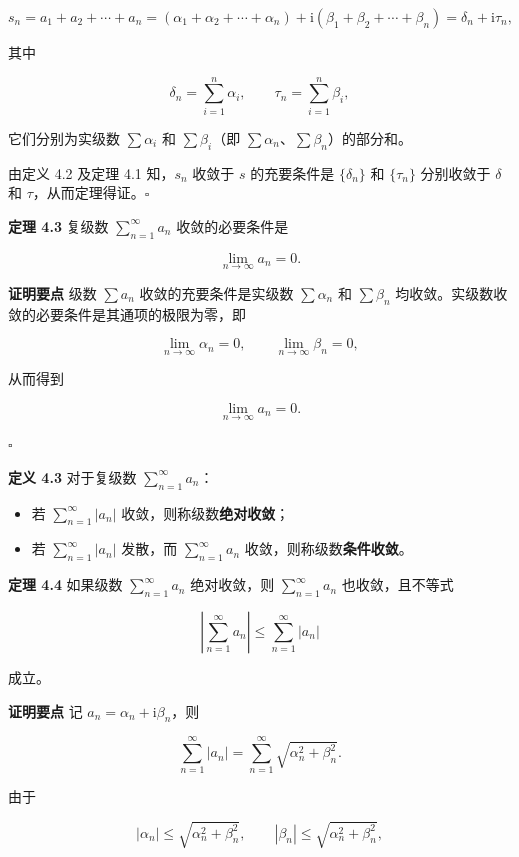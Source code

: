 \[
s_n=a_1+a_2+\cdots+a_n=(\alpha_1+\alpha_2+\cdots+\alpha_n)+\mathrm{i}(\beta_1+\beta_2+\cdots+\beta_n)=\delta_n+\mathrm{i}\tau_n,
\]

其中

\[
\delta_n=\sum_{i=1}^{n}\alpha_i,\qquad \tau_n=\sum_{i=1}^{n}\beta_i ,
\]

它们分别为实级数 \(\sum\alpha_i\) 和 \(\sum\beta_i\)（即
\(\sum\alpha_n\)、\(\sum\beta_n\)）的部分和。

由定义 4.2 及定理 4.1 知，\(s_n\) 收敛于 \(s\) 的充要条件是
\(\{\delta_n\}\) 和 \(\{\tau_n\}\) 分别收敛于 \(\delta\) 和
\(\tau\)，从而定理得证。\(\square\)

\textbf{定理 4.3} 复级数 \(\displaystyle\sum_{n=1}^{\infty}a_n\)
收敛的必要条件是

\[
\lim_{n\to\infty}a_n=0 .
\]

\textbf{证明要点} 级数 \(\sum a_n\) 收敛的充要条件是实级数
\(\sum\alpha_n\) 和 \(\sum\beta_n\)
均收敛。实级数收敛的必要条件是其通项的极限为零，即

\[
\lim_{n\to\infty}\alpha_n=0,\qquad \lim_{n\to\infty}\beta_n=0,
\]

从而得到

\[
\lim_{n\to\infty}a_n=0 .
\]

\(\square\)

\textbf{定义 4.3} 对于复级数 \(\displaystyle\sum_{n=1}^{\infty}a_n\)：

\begin{itemize}
\tightlist
\item
  若 \(\displaystyle\sum_{n=1}^{\infty}|a_n|\)
  收敛，则称级数\textbf{绝对收敛}；
\item
  若 \(\displaystyle\sum_{n=1}^{\infty}|a_n|\) 发散，而
  \(\displaystyle\sum_{n=1}^{\infty}a_n\)
  收敛，则称级数\textbf{条件收敛}。
\end{itemize}

\textbf{定理 4.4} 如果级数 \(\displaystyle\sum_{n=1}^{\infty}a_n\)
绝对收敛，则 \(\displaystyle\sum_{n=1}^{\infty}a_n\) 也收敛，且不等式

\[
\left|\sum_{n=1}^{\infty}a_n\right|\le\sum_{n=1}^{\infty}|a_n|
\]

成立。

\textbf{证明要点} 记 \(a_n=\alpha_n+\mathrm{i}\beta_n\)，则

\[
\sum_{n=1}^{\infty}|a_n|=\sum_{n=1}^{\infty}\sqrt{\alpha_n^2+\beta_n^2}.
\]

由于

\[
|\alpha_n|\le\sqrt{\alpha_n^2+\beta_n^2},\qquad |\beta_n|\le\sqrt{\alpha_n^2+\beta_n^2},
\]

